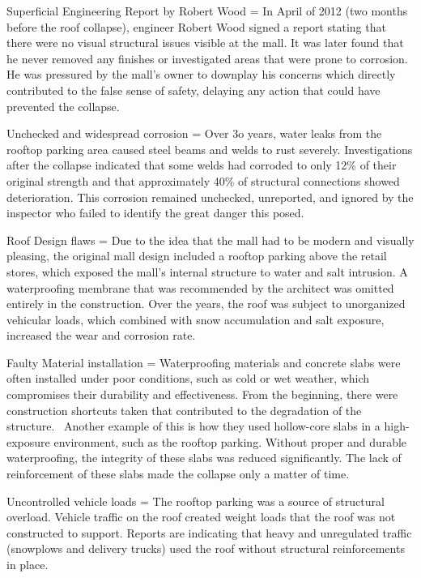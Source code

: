 \documentclass[12pt]{article}
\begin{document}
 

 
Superficial Engineering Report by Robert Wood = In April of 2012 (two months before the roof collapse), engineer Robert Wood signed a report stating that there were no visual structural issues visible at the mall. It was later found that he never removed any finishes or investigated areas that were prone to corrosion. He was pressured by the mall’s owner to downplay his concerns which directly contributed to the false sense of safety, delaying any action that could have prevented the collapse. 

 

 
Unchecked and widespread corrosion = Over 3o years, water leaks from the rooftop parking area caused steel beams and welds to rust severely. Investigations after the collapse indicated that some welds had corroded to only 12\% of their original strength and that approximately 40\% of structural connections showed deterioration. This corrosion remained unchecked, unreported, and ignored by the inspector who failed to identify the great danger this posed. 

 

 
Roof Design flaws = Due to the idea that the mall had to be modern and visually pleasing, the original mall design included a rooftop parking above the retail stores, which exposed the mall's internal structure to water and salt intrusion. A waterproofing membrane that was recommended by the architect was omitted entirely in the construction. Over the years, the roof was subject to unorganized vehicular loads, which combined with snow accumulation and salt exposure, increased the wear and corrosion rate.

 

 
Faulty Material installation = Waterproofing materials and concrete slabs were often installed under poor conditions, such as cold or wet weather, which compromises their durability and effectiveness. From the beginning, there were construction shortcuts taken that contributed to the degradation of the structure.  Another example of this is how they used hollow-core slabs in a high-exposure environment, such as the rooftop parking. Without proper and durable waterproofing, the integrity of these slabs was reduced significantly. The lack of reinforcement of these slabs made the collapse only a matter of time. 

 

 

 
Uncontrolled vehicle loads = The rooftop parking was a source of structural overload. Vehicle traffic on the roof created weight loads that the roof was not constructed to support. Reports are indicating that heavy and unregulated traffic (snowplows and delivery trucks) used the roof without structural reinforcements in place. 
\end{document}
